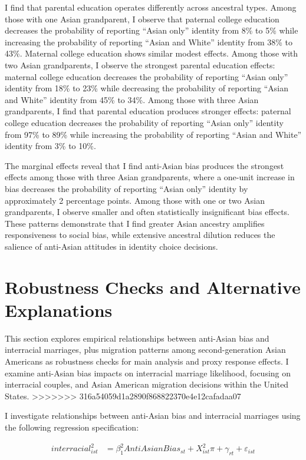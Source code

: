 I find that parental education operates differently across ancestral types. Among those with one Asian grandparent, I observe that paternal college education decreases the probability of reporting ``Asian only'' identity from 8\% to 5\% while increasing the probability of reporting ``Asian and White'' identity from 38\% to 43\%. Maternal college education shows similar modest effects. Among those with two Asian grandparents, I observe the strongest parental education effects: maternal college education decreases the probability of reporting ``Asian only'' identity from 18\% to 23\% while decreasing the probability of reporting ``Asian and White'' identity from 45\% to 34\%. Among those with three Asian grandparents, I find that parental education produces stronger effects: paternal college education decreases the probability of reporting ``Asian only'' identity from 97\% to 89\% while increasing the probability of reporting ``Asian and White'' identity from 3\% to 10\%.

The marginal effects reveal that I find anti-Asian bias produces the strongest effects among those with three Asian grandparents, where a one-unit increase in bias decreases the probability of reporting ``Asian only'' identity by approximately 2 percentage points. Among those with one or two Asian grandparents, I observe smaller and often statistically insignificant bias effects. These patterns demonstrate that I find greater Asian ancestry amplifies responsiveness to social bias, while extensive ancestral dilution reduces the salience of anti-Asian attitudes in identity choice decisions.

\section{Robustness Checks and Alternative Explanations}\label{sec:robcheck}

This section explores empirical relationships between anti-Asian bias and interracial marriages, plus migration patterns among second-generation Asian Americans as robustness checks for main analysis and proxy response effects. I examine anti-Asian bias impacts on interracial marriage likelihood, focusing on interracial couples, and Asian American migration decisions within the United States.
>>>>>>> 316a54059d1a2890f868822370e4e12cafadaa07

I investigate relationships between anti-Asian bias and interracial marriages using the following regression specification:

\begin{align}
interracial_{ist}^2 &= \beta_1^2 AntiAsianBias_{st} + X_{ist}^2\pi + \gamma_{rt} 
            + \varepsilon_{ist}  \label{eq:inter-interracial} 
\end{align}


